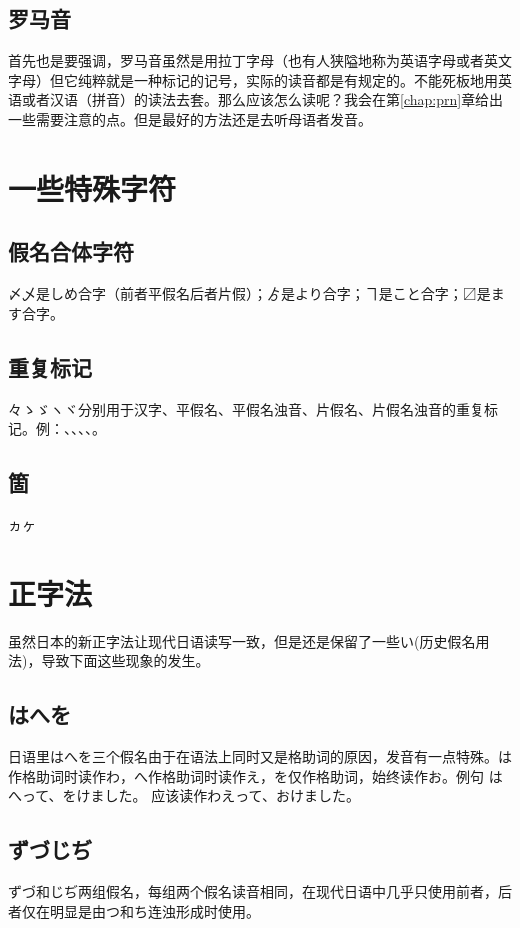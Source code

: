 \documentclass[12pt, a4paper, oneside]{book}
\newcommand{\jp}{\CJKfamily{zj}}
\begin{document}
\subsection{罗马音}
首先也是要强调，罗马音虽然是用拉丁字母（也有人狭隘地称为英语字母或者英文字母）但它纯粹就是一种标记的记号，实际的读音都是有规定的。不能死板地用英语或者汉语（拼音）的读法去套。那么应该怎么读呢？我会在第\ref{chap:prn}章给出一些需要注意的点。但是最好的方法还是去听母语者发音。
\section{一些特殊字符}
\subsection{假名合体字符}
〆乄是しめ合字（前者平假名后者片假）；{\jp ゟ}是より合字；ヿ是こと合字；〼是ます合字。
\subsection{重复标记}
々ゝゞヽヾ分别用于汉字、平假名、平假名浊音、片假名、片假名浊音的重复标记。例：{\jp {}、、、、}。
\subsection{箇}
ヵヶ
\section{正字法}
虽然日本的新正字法让现代日语读写一致，但是还是保留了一些{\jp {}い}(历史假名用法)，导致下面这些现象的发生。
\subsection{はへを}
日语里はへを三个假名由于在语法上同时又是格助词的原因，发音有一点特殊。は作格助词时读作わ，へ作格助词时读作え，を仅作格助词，始终读作お。例句
{\jp {}はへって、をけました。}
应该读作{\jp {}わえって、おけました。}
\subsection{ずづじぢ}
ずづ和じぢ两组假名，每组两个假名读音相同，在现代日语中几乎只使用前者，后者仅在明显是由つ和ち连浊形成时使用。
\end{document}
